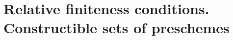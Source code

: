 \section{Relative finiteness conditions. Constructible sets of preschemes}
\label{section:relative-finiteness-conditions-constructible-sets-of-preschemes}

